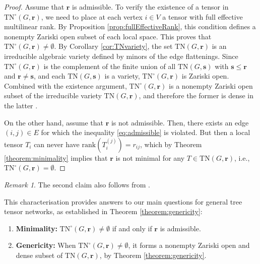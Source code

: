 \documentclass{amsart}
\theoremstyle{plain}
\theoremstyle{definition}
\theoremstyle{remark}
\newtheorem{remark}[theorem]{Remark}
\begin{document}
\begin{proof}[Proof]
Assume that $\mathbf{r}$ is admissible. To verify the existence of a tensor in $\mathrm{TN}^\circ(G, \mathbf{r})$, we need to place at each vertex $i \in V$ a tensor with full effective multilinear rank. By Proposition \ref{prop:fullEffectiveRank}, this condition defines a nonempty Zariski open subset of each local space. This proves that $\mathrm{TN}^\circ(G, \mathbf{r}) \neq \emptyset$. By Corollary \ref{cor:TNvariety}, the set $\mathrm{TN}(G, \mathbf{r})$ is an irreducible algebraic variety defined by minors of the edge flattenings. Since $\mathrm{TN}^\circ(G, \mathbf{r})$ is the complement of the finite union of all $\mathrm{TN}(G, \mathbf{s})$ with $\mathbf{s} \le \mathbf{r}$ and $\mathbf r \ne \mathbf s$, and each $\mathrm{TN}(G, \mathbf{s})$ is a variety, $\mathrm{TN}^\circ(G, \mathbf{r})$ is Zariski open. Combined with the existence argument, $\mathrm{TN}^\circ(G, \mathbf{r})$ is a nonempty Zariski open subset of the irreducible variety $\mathrm{TN}(G, \mathbf{r})$, and therefore the former is dense in the latter \cite{idealsvarieties}. 

On the other hand, assume that $\mathbf r$ is not admissible. Then, there exists an edge $(i, j)\in E$ for which the inequality \eqref{eq:admissible} is violated. But then a local tensor $T_i$ can never have $\mathrm{rank}(T_i^{(j)})=r_{ij}$, which by Theorem \ref{theorem:minimality} implies that $\mathbf{r}$ is not minimal for any $T \in \mathrm{TN}(G, \mathbf{r})$, i.e., $\mathrm{TN}^\circ(G, \mathbf{r}) = \emptyset$.
\end{proof}

\begin{remark}
	The second claim also follows from
\cite[Lemma 4.2]{bernardiDimensionTensorNetwork2023}.
\end{remark}

This characterisation provides answers to our main questions for general tree tensor networks, as established in Theorem \ref{theorem:genericity}:

\begin{enumerate}[label=A\arabic*]
    \item \textbf{Minimality:} $\mathrm{TN}^\circ(G, \mathbf{r}) \neq \emptyset$ if and only if $\mathbf{r}$ is admissible.

    \item \textbf{Genericity:} When $\mathrm{TN}^\circ(G, \mathbf{r}) \neq \emptyset$, it forms a nonempty Zariski open and dense subset of $\mathrm{TN}(G, \mathbf{r})$, by Theorem \ref{theorem:genericity}.
\end{enumerate}
\end{document}
